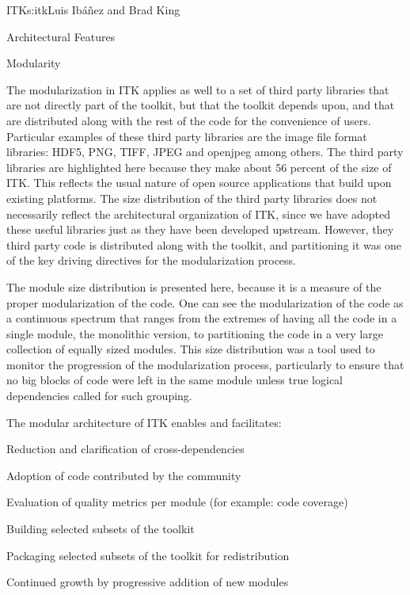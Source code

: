 \begin{aosachapter}{ITK}{s:itk}{Luis Ib\'{a}\~{n}ez and Brad King}
\begin{aosasect1}{Architectural Features}
\begin{aosasect2}{Modularity}

The modularization in ITK applies as well to a set of third party libraries
that are not directly part of the toolkit, but that the toolkit depends upon,
and that are distributed along with the rest of the code for the convenience of
users. Particular examples of these third party libraries are the image file
format libraries: HDF5, PNG, TIFF, JPEG and openjpeg among others.  The third
party libraries are highlighted here because they make about 56 percent of the
size of ITK. This reflects the usual nature of open source applications that
build upon existing platforms. The size distribution of the third party
libraries does not necessarily reflect the architectural organization of ITK,
since we have adopted these useful libraries just as they have been developed
upstream. However, they third party code is distributed along with the toolkit,
and partitioning it was one of the key driving directives for the
modularization process.

The module size distribution is presented here, because it is a measure of the
proper modularization of the code. One can see the modularization of the code
as a continuous spectrum that ranges from the extremes of having all the code in a
single module, the monolithic version, to partitioning the code
 in a very large collection of equally sized modules. This size
distribution was a tool used to monitor the progression of the modularization
process, particularly to ensure that no big blocks of code were left in the
same module unless true logical dependencies called for such grouping.

The modular architecture of ITK enables and facilitates:

\begin{aosaitemize}
\item Reduction and clarification of cross-dependencies
\item Adoption of code contributed by the community
\item Evaluation of quality metrics per module (for example: code coverage)
\item Building selected subsets of the toolkit
\item Packaging selected subsets of the toolkit for redistribution
\item Continued growth by progressive addition of new modules
\end{aosaitemize}
\end{aosasect2}


\end{aosasect1}
\end{aosachapter}

